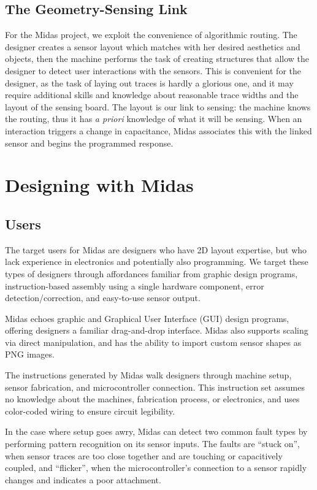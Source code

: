 \subsection{The Geometry-Sensing Link}

For the Midas project, we exploit the convenience of algorithmic routing. The designer creates a sensor layout which matches with her desired aesthetics and objects, then the machine performs the task of creating structures that allow the designer to detect user interactions with the sensors. This is convenient for the designer, as the task of laying out traces is hardly a glorious one, and it may require additional skills and knowledge about reasonable trace widths and the layout of the sensing board. The layout is our link to sensing: the machine knows the routing, thus it has \emph{a priori} knowledge of what it will be sensing. When an interaction triggers a change in capacitance, Midas associates this with the linked sensor and begins the programmed response.

\section{Designing with Midas}
    \subsection{Users}
    
    The target users for Midas are designers who have 2D layout expertise, but who lack experience in electronics and potentially also programming.  We target these types of designers through affordances familiar from graphic design programs, instruction-based assembly using a single hardware component, error detection/correction, and easy-to-use sensor output.

Midas echoes graphic and Graphical User Interface (GUI) design programs, offering designers a familiar drag-and-drop interface.  Midas also supports scaling via direct manipulation, and has the ability to import custom sensor shapes as PNG images.

The instructions generated by Midas walk designers through machine setup, sensor fabrication, and microcontroller connection.  This instruction set assumes no knowledge about the machines, fabrication process, or electronics, and uses color-coded wiring to ensure circuit legibility.

In the case where setup goes awry, Midas can detect two common fault types by performing pattern recognition on its sensor inputs.  The faults are ``stuck on'', when sensor traces are too close together and are touching or capacitively coupled, and ``flicker'', when the microcontroller's connection to a sensor rapidly changes and indicates a poor attachment.

